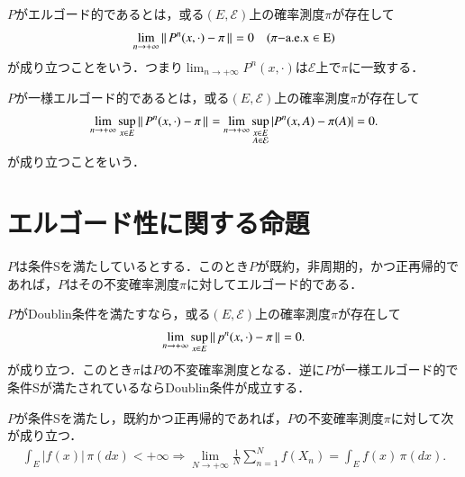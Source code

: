 	\begin{dfn}[エルゴード性]
		$P$がエルゴード的であるとは，或る$(E,\mathcal{E})$上の確率測度$\pi$が存在して
		\begin{align}
			\lim_{n \to +\infty} \left\|\, P^n(x,\cdot) - \pi\, \right\|_{} = 0 \quad (\pi \rm{-a.e.}x \in E)
		\end{align}
		が成り立つことをいう．つまり$\displaystyle \lim_{n \to +\infty} P^n(x,\cdot)$は$\mathcal{E}$上で$\pi$に一致する．
	\end{dfn}
	
	\begin{dfn}[一様エルゴード性]
		$P$が一様エルゴード的であるとは，或る$(E,\mathcal{E})$上の確率測度$\pi$が存在して
		\begin{align}
			\lim_{n \to +\infty} \operatorname*{sup}_{x \in E} \left\|\, P^n(x,\cdot) - \pi\, \right\|_{} = \lim_{n \to +\infty} \operatorname*{sup}_{\substack{x \in E \\ A \in \mathcal{E}}} \left| P^n(x,A) - \pi(A)\right| =0.
		\end{align}
		が成り立つことをいう．
	\end{dfn}
	
\section{エルゴード性に関する命題}
	\begin{prp}[エルゴード性]
		$P$は条件Sを満たしているとする．このとき$P$が既約，非周期的，かつ正再帰的であれば，$P$はその不変確率測度$\pi$に対してエルゴード的である．
	\end{prp}
	
	\begin{prp}[一様エルゴード性]
		$P$がDoublin条件を満たすなら，或る$(E,\mathcal{E})$上の確率測度$\pi$が存在して
		\begin{align}
			\lim_{n \to +\infty} \operatorname*{sup}_{x \in E} \left\|\, p^n(x,\cdot) - \pi\, \right\|_{} = 0.
		\end{align}
		が成り立つ．このとき$\pi$は$P$の不変確率測度となる．逆に$P$が一様エルゴード的で条件Sが満たされているならDoublin条件が成立する．
	\end{prp}
	
	\begin{prp}[大数の法則]
		$P$が条件Sを満たし，既約かつ正再帰的であれば，$P$の不変確率測度$\pi$に対して次が成り立つ．
		\begin{align}
			\int_E |f(x)|\, \pi(dx) < +\infty \Rightarrow \lim_{N \to +\infty} \frac{1}{N} \sum_{n=1}^{N} f(X_n) = \int_E f(x)\, \pi(dx).
		\end{align}
	\end{prp}
	
